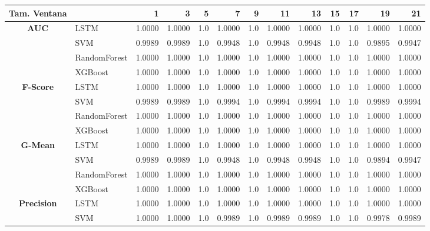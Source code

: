 \begin{table}[h]
	\centering
	\begin{adjustbox}{max width=13cm}
		\begin{tabular}{|c|l|r|r|r|r|r|r|r|r|r|r|r|}
			\hline
			\textbf{Tam. Ventana}&         &      1  &      3  &   5  &      7  &   9  &      11 &      13 &   15 &   17 &      19 &      21 \\
			\hline
			\textbf{AUC} & LSTM &  1.0000 &  1.0000 &  1.0 &  1.0000 &  1.0 &  1.0000 &  1.0000 &  1.0 &  1.0 &  1.0000 &  1.0000 \\
			& SVM &  0.9989 &  0.9989 &  1.0 &  0.9948 &  1.0 &  0.9948 &  0.9948 &  1.0 &  1.0 &  0.9895 &  0.9947 \\
			& RandomForest &  1.0000 &  1.0000 &  1.0 &  1.0000 &  1.0 &  1.0000 &  1.0000 &  1.0 &  1.0 &  1.0000 &  1.0000 \\
			& XGBoost &  1.0000 &  1.0000 &  1.0 &  1.0000 &  1.0 &  1.0000 &  1.0000 &  1.0 &  1.0 &  1.0000 &  1.0000 \\
			\hline
			\textbf{F-Score} & LSTM &  1.0000 &  1.0000 &  1.0 &  1.0000 &  1.0 &  1.0000 &  1.0000 &  1.0 &  1.0 &  1.0000 &  1.0000 \\
			& SVM &  0.9989 &  0.9989 &  1.0 &  0.9994 &  1.0 &  0.9994 &  0.9994 &  1.0 &  1.0 &  0.9989 &  0.9994 \\
			& RandomForest &  1.0000 &  1.0000 &  1.0 &  1.0000 &  1.0 &  1.0000 &  1.0000 &  1.0 &  1.0 &  1.0000 &  1.0000 \\
			& XGBoost &  1.0000 &  1.0000 &  1.0 &  1.0000 &  1.0 &  1.0000 &  1.0000 &  1.0 &  1.0 &  1.0000 &  1.0000 \\
			\hline
			\textbf{G-Mean} & LSTM &  1.0000 &  1.0000 &  1.0 &  1.0000 &  1.0 &  1.0000 &  1.0000 &  1.0 &  1.0 &  1.0000 &  1.0000 \\
			& SVM &  0.9989 &  0.9989 &  1.0 &  0.9948 &  1.0 &  0.9948 &  0.9948 &  1.0 &  1.0 &  0.9894 &  0.9947 \\
			& RandomForest &  1.0000 &  1.0000 &  1.0 &  1.0000 &  1.0 &  1.0000 &  1.0000 &  1.0 &  1.0 &  1.0000 &  1.0000 \\
			& XGBoost &  1.0000 &  1.0000 &  1.0 &  1.0000 &  1.0 &  1.0000 &  1.0000 &  1.0 &  1.0 &  1.0000 &  1.0000 \\
			\hline
			\textbf{Precision} & LSTM &  1.0000 &  1.0000 &  1.0 &  1.0000 &  1.0 &  1.0000 &  1.0000 &  1.0 &  1.0 &  1.0000 &  1.0000 \\
			& SVM &  1.0000 &  1.0000 &  1.0 &  0.9989 &  1.0 &  0.9989 &  0.9989 &  1.0 &  1.0 &  0.9978 &  0.9989 \\

\end{tabular}
\end{adjustbox}
\end{table}
